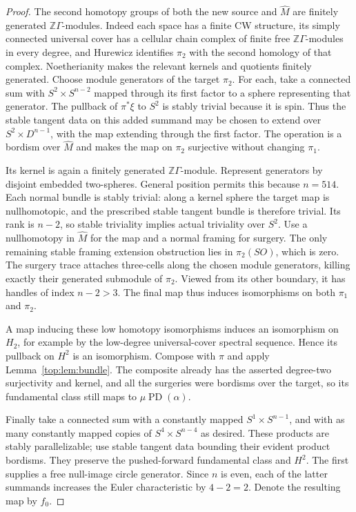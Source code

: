 \documentclass[11pt]{article}
\numberwithin{equation}{section}
\theoremstyle{definition}
\theoremstyle{remark}
\begin{document}
\begin{proof}
The second homotopy groups of both the new source and $\widehat M$ are
finitely generated $\mathbb Z\Gamma$-modules.  Indeed each space has a finite
CW structure, its simply connected universal cover has a cellular chain
complex of finite free $\mathbb Z\Gamma$-modules in every degree, and
Hurewicz identifies $\pi_2$ with the second homology of that complex.
Noetherianity makes the relevant kernels and quotients finitely
generated.  Choose module generators of the target $\pi_2$.  For each,
take a connected sum with $S^2\times S^{n-2}$ mapped through its first
factor to a sphere representing that generator.  The pullback of
$\pi^*\xi$ to $S^2$ is stably trivial because it is spin.  Thus the
stable tangent data on this added summand may be chosen to extend over
$S^2\times D^{n-1}$, with the map extending through the first factor.
The operation is a bordism over $\widehat M$ and makes the map on
$\pi_2$ surjective without changing $\pi_1$.

Its kernel is again a finitely generated $\mathbb Z\Gamma$-module.  Represent
generators by disjoint embedded two-spheres.  General position permits
this because $n=514$.  Each normal bundle is stably trivial: along a
kernel sphere the target map is nullhomotopic, and the prescribed stable
tangent bundle is therefore trivial.  Its rank is $n-2$, so stable
triviality implies actual triviality over $S^2$.  Use a nullhomotopy in
$\widehat M$ for the map and a normal framing for surgery.  The only
remaining stable framing extension obstruction lies in $\pi_2(SO)$,
which is zero.  The surgery trace attaches three-cells along the chosen
module generators, killing exactly their generated submodule of
$\pi_2$.  Viewed from its other boundary, it has handles of index
$n-2>3$.  The final map thus induces isomorphisms on both $\pi_1$ and
$\pi_2$.

A map inducing these low homotopy isomorphisms induces an isomorphism
on $H_2$, for example by the low-degree universal-cover spectral
sequence.  Hence its pullback on $H^2$ is an isomorphism.  Compose with
$\pi$ and apply Lemma~\ref{top:lem:bundle}.  The composite already has
the asserted degree-two surjectivity and kernel, and all the surgeries
were bordisms over the target, so its fundamental class still maps to
$\mu\operatorname{PD}(\alpha)$.

Finally take a connected sum with a constantly mapped
$S^1\times S^{n-1}$, and with as many constantly mapped copies of
$S^4\times S^{n-4}$ as desired.  These products are stably
parallelizable; use stable tangent data bounding their evident product
bordisms.  They preserve the pushed-forward fundamental class and
$H^2$.  The first supplies a free null-image circle generator.  Since
$n$ is even, each of the latter summands increases the Euler
characteristic by $4-2=2$.  Denote the resulting map by $f_0$.


\end{proof}
\end{document}
